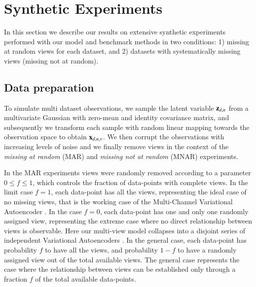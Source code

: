 \section{Synthetic Experiments}
\label{sec:synth}

In this section we describe our results on extensive synthetic experiments performed with our model and benchmark methods in two conditions:
1) missing at random views for each dataset,
and 2) datasets with systematically missing views (missing not at random).

\subsection{Data preparation}

To simulate multi dataset observations, we sample the latent variable $\mathbf{z}_{d,n}$ from a multivariate Gaussian with zero-mean and identity covariance matrix, and subsequently we transform each sample with random linear mapping towards the observation space to obtain $\mathbf{x}_{d,n,v}$.
We then corrupt the observations with increasing levels of noise
and we finally remove views in the context of the \textit{missing at random} (MAR) and \textit{missing not at random} (MNAR) experiments.

In the MAR experiments views were randomly removed according to a parameter $0 \leq f \leq 1$, which controls the fraction of data-points with complete views.
In the limit case $f=1$, each data-point has all the views, representing the ideal case of no missing views, that is the working case of the Multi-Channel Variational Autoencoder \citep{Antelmi2019}.
In the case $f=0$, each data-point has one and only one randomly assigned view, representing the extreme case where no direct relationship between views is observable.
Here our multi-view model collapses into a disjoint series of independent Variational Autoencoders \citep{Kingma2013, Rezende2014}.
In the general case, each data-point has probability $f$ to have all the views, and probability $1-f$ to have a randomly assigned view out of the total available views.
The general case represents the case where the relationship between views can be established only through a fraction $f$ of the total available data-points.


